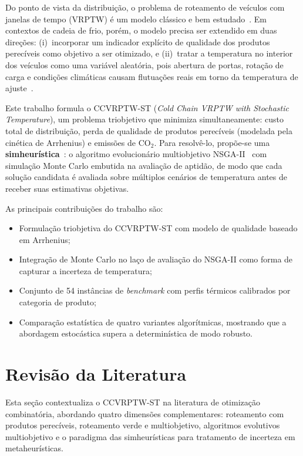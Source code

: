 \documentclass[a4paper,11pt]{article}
\begin{document}
Do ponto de vista da distribuição, o problema de roteamento de veículos
com janelas de tempo (VRPTW) é um modelo clássico e bem estudado~\citep{solomon:1987}.
Em contextos de cadeia de frio, porém, o modelo precisa ser extendido em duas
direções: (i)~incorporar um indicador explícito de qualidade dos produtos
perecíveis como objetivo a ser otimizado, e (ii)~tratar a temperatura no interior
dos veículos como uma variável aleatória, pois abertura de portas, rotação de
carga e condições climáticas causam flutuações reais em torno da temperatura
de ajuste~\citep{osvald:2008,coelho:2014}.

Este trabalho formula o CCVRPTW-ST (\textit{Cold Chain VRPTW with Stochastic Temperature}),
um problema triobjetivo que minimiza simultaneamente:
custo total de distribuição, perda de qualidade de produtos perecíveis
(modelada pela cinética de Arrhenius) e emissões de CO$_2$.
Para resolv\^e-lo, propõe-se uma \textbf{simheurística}~\citep{juan:2015}: o algoritmo
evolucionário multiobjetivo NSGA-II~\citep{deb:2002} com simulação Monte Carlo
embutida na avaliação de aptidão, de modo que cada solução candidata é
avaliada sobre múltiplos cenários de temperatura antes de receber suas
estimativas objetivas.

As principais contribuições do trabalho são:

\begin{itemize}
\item Formulação triobjetiva do CCVRPTW-ST com modelo de qualidade baseado
      em Arrhenius;
\item Integração de Monte Carlo no laço de avaliação do NSGA-II como forma
      de capturar a incerteza de temperatura;
\item Conjunto de 54 inst\^ancias de \textit{benchmark} com perfis térmicos
      calibrados por categoria de produto;
\item Comparação estatística de quatro variantes algorítmicas, mostrando que
      a abordagem estocástica supera a determinística de modo robusto.
\end{itemize}

\section{Revisão da Literatura}

Esta seção contextualiza o CCVRPTW-ST na literatura de otimização combinatória, abordando quatro dimensões complementares: roteamento com produtos perecíveis, roteamento verde e multiobjetivo, algoritmos evolutivos multiobjetivo e o paradigma das simheurísticas para tratamento de incerteza em metaheurísticas.
\end{document}
